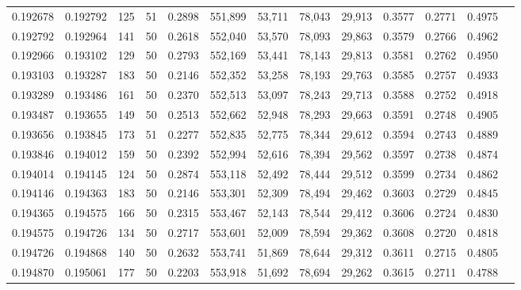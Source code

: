 \begin{tabular}{rrrrrrrrrrrrr}
0.192678 & 0.192792 &   125 &  51 &                                     0.2898 & 551,899 &  53,711 &  78,043 &  29,913 & 0.3577 & 0.2771 & 0.4975 \\
0.192792 & 0.192964 &   141 &  50 &                                     0.2618 & 552,040 &  53,570 &  78,093 &  29,863 & 0.3579 & 0.2766 & 0.4962 \\
0.192966 & 0.193102 &   129 &  50 &                                     0.2793 & 552,169 &  53,441 &  78,143 &  29,813 & 0.3581 & 0.2762 & 0.4950 \\
0.193103 & 0.193287 &   183 &  50 &                                     0.2146 & 552,352 &  53,258 &  78,193 &  29,763 & 0.3585 & 0.2757 & 0.4933 \\
0.193289 & 0.193486 &   161 &  50 &                                     0.2370 & 552,513 &  53,097 &  78,243 &  29,713 & 0.3588 & 0.2752 & 0.4918 \\
0.193487 & 0.193655 &   149 &  50 &                                     0.2513 & 552,662 &  52,948 &  78,293 &  29,663 & 0.3591 & 0.2748 & 0.4905 \\
0.193656 & 0.193845 &   173 &  51 &                                     0.2277 & 552,835 &  52,775 &  78,344 &  29,612 & 0.3594 & 0.2743 & 0.4889 \\
0.193846 & 0.194012 &   159 &  50 &                                     0.2392 & 552,994 &  52,616 &  78,394 &  29,562 & 0.3597 & 0.2738 & 0.4874 \\
0.194014 & 0.194145 &   124 &  50 &                                     0.2874 & 553,118 &  52,492 &  78,444 &  29,512 & 0.3599 & 0.2734 & 0.4862 \\
0.194146 & 0.194363 &   183 &  50 &                                     0.2146 & 553,301 &  52,309 &  78,494 &  29,462 & 0.3603 & 0.2729 & 0.4845 \\
0.194365 & 0.194575 &   166 &  50 &                                     0.2315 & 553,467 &  52,143 &  78,544 &  29,412 & 0.3606 & 0.2724 & 0.4830 \\
0.194575 & 0.194726 &   134 &  50 &                                     0.2717 & 553,601 &  52,009 &  78,594 &  29,362 & 0.3608 & 0.2720 & 0.4818 \\
0.194726 & 0.194868 &   140 &  50 &                                     0.2632 & 553,741 &  51,869 &  78,644 &  29,312 & 0.3611 & 0.2715 & 0.4805 \\
0.194870 & 0.195061 &   177 &  50 &                                     0.2203 & 553,918 &  51,692 &  78,694 &  29,262 & 0.3615 & 0.2711 & 0.4788 \\

\end{tabular}
